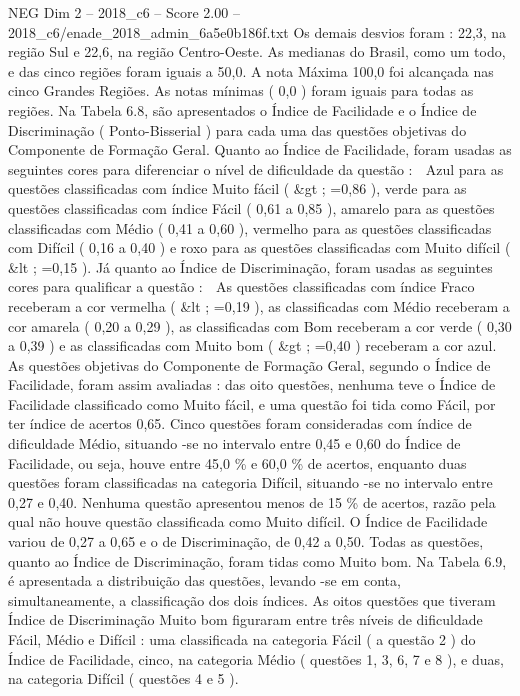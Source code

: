 \begin{textsample}{NEG Dim 2 – 2018\_c6 – Score 2.00 – 2018\_c6/enade\_2018\_admin\_6a5e0b186f.txt}
Os demais desvios foram : 22,3, na região Sul e 22,6, na região Centro-Oeste.
As medianas do Brasil, como um todo, e das cinco regiões foram iguais a 50,0.
A nota Máxima 100,0 foi alcançada nas cinco Grandes Regiões.
As notas mínimas ( 0,0 ) foram iguais para todas as regiões.
Na Tabela 6.8, são apresentados o Índice de Facilidade e o Índice de Discriminação ( Ponto-Bisserial ) para cada uma das questões objetivas do Componente de Formação Geral.
Quanto ao Índice de Facilidade, foram usadas as seguintes cores para diferenciar o nível de dificuldade da questão :  Azul para as questões classificadas com índice Muito fácil ( \&gt ; =0,86 ), verde para as questões classificadas com índice Fácil ( 0,61 a 0,85 ), amarelo para as questões classificadas com Médio ( 0,41 a 0,60 ), vermelho para as questões classificadas com Difícil ( 0,16 a 0,40 ) e roxo para as questões classificadas com Muito difícil ( \&lt ; =0,15 ).
Já quanto ao Índice de Discriminação, foram usadas as seguintes cores para qualificar a questão :  As questões classificadas com índice Fraco receberam a cor vermelha ( \&lt ; =0,19 ), as classificadas com Médio receberam a cor amarela ( 0,20 a 0,29 ), as classificadas com Bom receberam a cor verde ( 0,30 a 0,39 ) e as classificadas com Muito bom ( \&gt ; =0,40 ) receberam a cor azul.
As questões objetivas do Componente de Formação Geral, segundo o Índice de Facilidade, foram assim avaliadas : das oito questões, nenhuma teve o Índice de Facilidade classificado como Muito fácil, e uma questão foi tida como Fácil, por ter índice de acertos 0,65.
Cinco questões foram consideradas com índice de dificuldade Médio, situando -se no intervalo entre 0,45 e 0,60 do Índice de Facilidade, ou seja, houve entre 45,0 \% e 60,0 \% de acertos, enquanto duas questões foram classificadas na categoria Difícil, situando -se no intervalo entre 0,27 e 0,40.
Nenhuma questão apresentou menos de 15 \% de acertos, razão pela qual não houve questão classificada como Muito difícil.
O Índice de Facilidade variou de 0,27 a 0,65 e o de Discriminação, de 0,42 a 0,50.
Todas as questões, quanto ao Índice de Discriminação, foram tidas como Muito bom.
Na Tabela 6.9, é apresentada a distribuição das questões, levando -se em conta, simultaneamente, a classificação dos dois índices.
As oitos questões que tiveram Índice de Discriminação Muito bom figuraram entre três níveis de dificuldade Fácil, Médio e Difícil : uma classificada na categoria Fácil ( a questão 2 ) do Índice de Facilidade, cinco, na categoria Médio ( questões 1, 3, 6, 7 e 8 ), e duas, na categoria Difícil ( questões 4 e 5 ).

\end{textsample}
